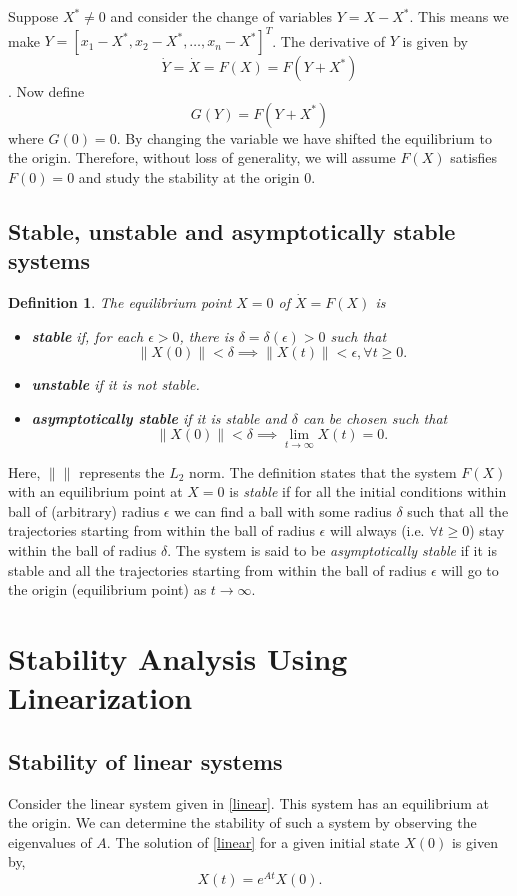 \documentclass{article}
\newtheorem{definition}{Definition}
\begin{document}
Suppose $X^*\neq0$ and consider the change of variables $Y=X-X^*$. This means we make $Y=[x_1-X^*,x_2-X^*,\dots,x_n-X^*]^T$. The derivative of $Y$ is given by 
$$\dot{Y}=\dot{X}=F(X)=F(Y+X^*)$$.
Now define
\begin{equation}
    G(Y) = F(Y+X^*)
\end{equation}
where $G(0)=0.$ By changing the variable we have shifted the equilibrium to the origin. Therefore, without loss of generality, we will assume $F(X)$ satisfies $F(0)=0$ and study the stability at the origin $0.$

\subsection{Stable, unstable and asymptotically stable systems}
\begin{definition}
    The equilibrium point $X=0$ of $\dot{X}=F(X)$ is
    \begin{itemize}
        \item \textbf{stable} if, for each $\epsilon > 0$, there is $\delta = \delta(\epsilon)>0$ such that
        $$\|X(0)\|<\delta \implies \|X(t)\|<\epsilon, \forall t\geq 0.$$

        \item \textbf{unstable} if it is not stable.

        \item \textbf{asymptotically stable} if it is stable \emph{and} $\delta$ can be chosen such that
        $$\|X(0)\|<\delta \implies \lim_{t \to \infty} X(t)=0.$$
    \end{itemize}
\end{definition}
Here, $\|\|$ represents the $L_2$ norm. The definition states that the system $F(X)$ with an equilibrium point at $X=0$ is \emph{stable} if for all the initial conditions within ball of (arbitrary) radius $\epsilon$ we can find a ball with some radius $\delta$ such that all the trajectories starting from within the ball of radius $\epsilon$ will always (i.e. $\forall t\geq 0$) stay within the ball of radius $\delta$. The system is said to be \emph{asymptotically stable} if it is stable and all the trajectories starting from within
the ball of radius $\epsilon$ will go to the origin (equilibrium point) as $t \to \infty.$ 

\section{Stability Analysis Using Linearization}
\subsection{Stability of linear systems}
Consider the linear system given in \eqref{linear}. This system has an equilibrium at the origin. We can determine the stability of such a system by observing the eigenvalues of $A.$ The solution of \eqref{linear} for a given initial state $X(0)$ is given by,
\begin{equation}\label{exp}
    X(t) = e^{At}X(0).
\end{equation}
\end{document}
